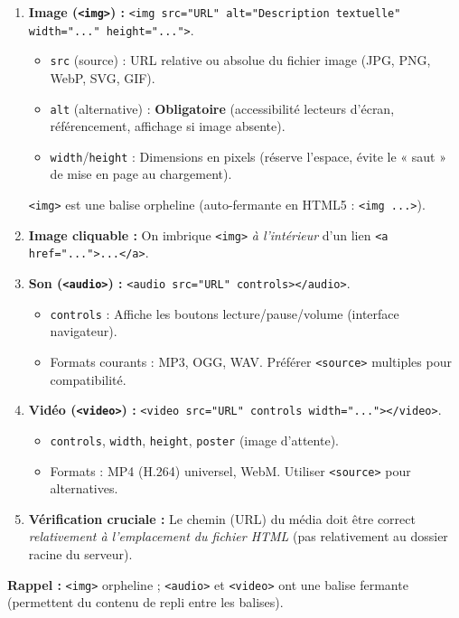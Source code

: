 \documentclass[11pt]{article}
\newcommand{\cle}[1]{{\popxbold\color{popdark}#1}}
\begin{document}
\begin{methode}
\begin{enumerate}
  \item \textbf{Image (\texttt{<img>}) :} \texttt{<img src="URL" alt="Description textuelle" width="..." height="...">}.
        \begin{itemize}
          \item \texttt{src} (source) : URL relative ou absolue du fichier image (JPG, PNG, WebP, SVG, GIF).
          \item \texttt{alt} (alternative) : \textbf{Obligatoire} (accessibilité lecteurs d'écran, référencement, affichage si image absente).
          \item \texttt{width}/\texttt{height} : Dimensions en pixels (réserve l'espace, évite le « saut » de mise en page au chargement).
        \end{itemize}
        \texttt{<img>} est une \cle{balise orpheline} (auto-fermante en HTML5 : \texttt{<img ...>}).
  \item \textbf{Image cliquable :} On imbrique \texttt{<img>} \emph{à l'intérieur} d'un lien \texttt{<a href="...">...</a>}.
  \item \textbf{Son (\texttt{<audio>}) :} \texttt{<audio src="URL" controls></audio>}.
        \begin{itemize}
          \item \texttt{controls} : Affiche les boutons lecture/pause/volume (interface navigateur).
          \item Formats courants : MP3, OGG, WAV. Préférer \texttt{<source>} multiples pour compatibilité.
        \end{itemize}
  \item \textbf{Vidéo (\texttt{<video>}) :} \texttt{<video src="URL" controls width="..."></video>}.
        \begin{itemize}
          \item \texttt{controls}, \texttt{width}, \texttt{height}, \texttt{poster} (image d'attente).
          \item Formats : MP4 (H.264) universel, WebM. Utiliser \texttt{<source>} pour alternatives.
        \end{itemize}
  \item \textbf{Vérification cruciale :} Le chemin (URL) du média doit être correct \emph{relativement à l'emplacement du fichier HTML} (pas relativement au dossier racine du serveur).
\end{enumerate}
\textbf{Rappel :} \texttt{<img>} orpheline ; \texttt{<audio>} et \texttt{<video>} ont une balise fermante (permettent du contenu de repli entre les balises).
\end{methode}
\end{document}
